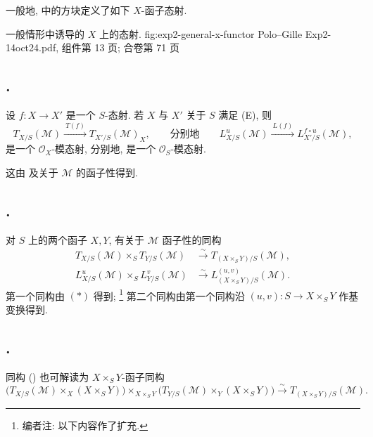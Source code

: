 一般地,  中的方块定义了如下
\(X\)-函子态射.

  {一般情形中诱导的 \(X\) 上的态射.}
  {fig:exp2-general-x-functor}
  {Polo--Gille Exp2-14oct24.pdf, 组件第 13 页; 合卷第 71 页}

\subsection*{.}
设 \(f:X\to X'\) 是一个 \(S\)-态射.
若 \(X\) 与 \(X'\) 关于 \(S\) 满足 (E), 则
\[
  T_{X/S}(\mathcal M)\xrightarrow{\ T(f)\ }
  T_{X'/S}(\mathcal M)_X,
  \qquad\text{分别地}\qquad
  L^u_{X/S}(\mathcal M)\xrightarrow{\ L(f)\ }
  L^{f\circ u}_{X'/S}(\mathcal M),
\]
是一个 \(\mathcal O_X\)-模态射, 分别地, 是一个
\(\mathcal O_S\)-模态射.

这由
及关于 \(\mathcal M\) 的函子性得到.

\subsection*{.}
对 \(S\) 上的两个函子 \(X,Y\), 有关于 \(\mathcal M\) 函子性的同构
\begin{align}
  T_{X/S}(\mathcal M)\times_ST_{Y/S}(\mathcal M)
    &\xrightarrow{\sim}T_{(X\times_SY)/S}(\mathcal M), \tag{3.8.1}\label{sga3:ii:subsection:3-5-1:equation:3-8-1}\\
  L^u_{X/S}(\mathcal M)\times_SL^v_{Y/S}(\mathcal M)
    &\xrightarrow{\sim}L^{(u,v)}_{(X\times_SY)/S}(\mathcal M). \tag{3.8.2}\label{sga3:ii:subsection:3-5-1:equation:3-8-2}
\end{align}
第一个同构由  \((*)\) 得到;
\footnote{编者注: 以下内容作了扩充.}
第二个同构由第一个同构沿 \((u,v):S\to X\times_SY\) 作基变换得到.

\subsection*{.}
同构 ()
也可解读为 \(X\times_SY\)-函子同构
\[
  \bigl(T_{X/S}(\mathcal M)\times_X(X\times_SY)\bigr)
  \mathop{\times}_{X\times_SY}
  \bigl(T_{Y/S}(\mathcal M)\times_Y(X\times_SY)\bigr)
  \xrightarrow{\sim}T_{(X\times_SY)/S}(\mathcal M).
\]

